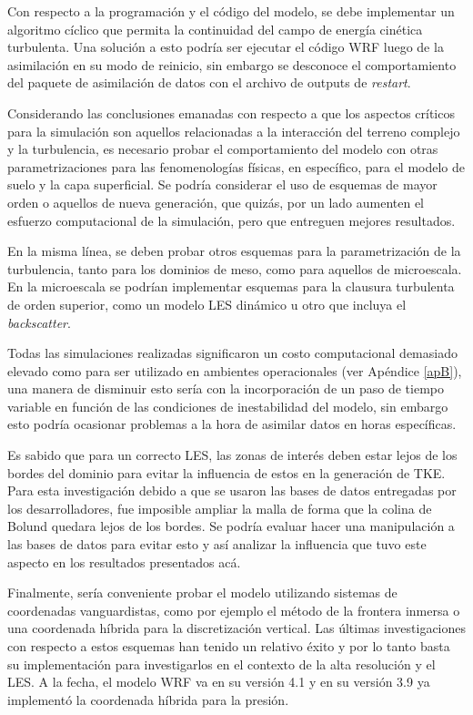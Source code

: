 \begin{itemize*}
	\item Con respecto a la programación y el código del modelo, se debe implementar un algoritmo cíclico que permita la continuidad del campo de energía cinética turbulenta. Una solución a esto podría ser ejecutar el código WRF luego de la asimilación en su modo de reinicio, sin embargo se desconoce el comportamiento del paquete de asimilación de datos con el archivo de outputs de \emph{restart}.
	\item Considerando las conclusiones emanadas con respecto a que los aspectos críticos para la simulación son aquellos relacionadas a la interacción del terreno complejo y la turbulencia, es necesario probar el comportamiento del modelo con otras parametrizaciones para las fenomenologías físicas, en específico, para el modelo de suelo y la capa superficial. Se podría considerar el uso de esquemas de mayor orden o aquellos de nueva generación, que quizás, por un lado aumenten el esfuerzo computacional de la simulación, pero que entreguen mejores resultados.
	\item En la misma línea, se deben probar otros esquemas para la parametrización de la turbulencia, tanto para los dominios de meso, como para aquellos de microescala. En la microescala se podrían implementar esquemas para la clausura turbulenta de orden superior, como un modelo LES dinámico u otro que incluya el \emph{backscatter}.
	\item Todas las simulaciones realizadas significaron un costo computacional demasiado elevado como para ser utilizado en ambientes operacionales (ver Apéndice \ref{apB}), una manera de disminuir esto sería con la incorporación de un paso de tiempo variable en función de las condiciones de inestabilidad del modelo, sin embargo esto podría ocasionar problemas a la hora de asimilar datos en horas específicas.
	\item Es sabido que para un correcto LES, las zonas de interés deben estar lejos de los bordes del dominio para evitar la influencia de estos en la generación de TKE. Para esta investigación debido a que se usaron las bases de datos entregadas por los desarrolladores, fue imposible ampliar la malla de forma que la colina de Bolund quedara lejos de los bordes. Se podría evaluar hacer una manipulación a las bases de datos para evitar esto y así analizar la influencia que tuvo este aspecto en los resultados presentados acá.
	\item Finalmente, sería conveniente probar el modelo utilizando sistemas de coordenadas vanguardistas, como por ejemplo el método de la frontera inmersa o una coordenada híbrida para la discretización vertical. Las últimas investigaciones con respecto a estos esquemas han tenido un relativo éxito y por lo tanto basta su implementación para investigarlos en el contexto de la alta resolución y el LES. A la fecha, el modelo WRF va en su versión 4.1 y en su versión 3.9 ya implementó la coordenada híbrida para la presión.
\end{itemize*}
